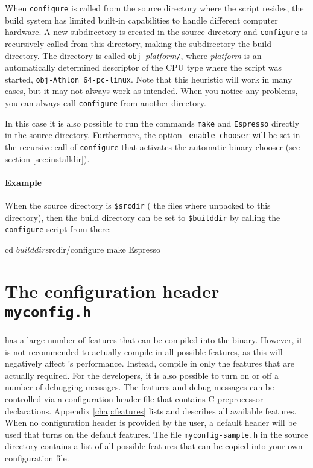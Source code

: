 When \texttt{configure} is called from the source directory where the
script resides, the \es build system has limited built-in capabilities
to handle different computer hardware.  A new subdirectory is created
in the source directory and \texttt{configure} is recursively called
from this directory, making the subdirectory the build directory.  The
directory is called \texttt{obj-}\textit{platform}\texttt{/}, where
\textit{platform} is an automatically determined descriptor of the CPU
type where the script was started, \eg
\mbox{\texttt{obj-Athlon\_64-pc-linux}}.  Note that this heuristic
will work in many cases, but it may not always work as intended.  When
you notice any problems, you can always call \texttt{configure} from
another directory.

In this case it is also possible to run the commands \texttt{make} and
\texttt{Espresso} directly in the source directory.  Furthermore, the
option \texttt{--enable-chooser} will be set in the recursive call of
\texttt{configure} that activates the automatic binary chooser (see
section \vref{sec:installdir}).

\paragraph{Example}
When the source directory is \texttt{\$srcdir} (\ie{} the files where
unpacked to this directory), then the build directory can be set to
\texttt{\$builddir} by calling the \texttt{configure}-script from
there:
\begin{code}
cd $builddir
$srcdir/configure
make
Espresso
\end{code}

\section{The configuration header \texttt{myconfig.h}}
\label{sec:myconfig}

  \es has a large number
of features that can be compiled into the binary. However, it is not
recommended to actually compile in all possible features, as this will
negatively affect \es's performance.  Instead, compile in only the
features that are actually required.  For the developers, it is also
possible to turn on or off a number of debugging messages.  The
features and debug messages can be controlled via a configuration
header file that contains C-preprocessor declarations. Appendix
\vref{chap:features} lists and describes all available features.  When
no configuration header is provided by the user, a default header will
be used that turns on the default features.  The file
\texttt{myconfig-sample.h} in the source directory contains a list of
all possible features that can be copied into your own configuration
file.


